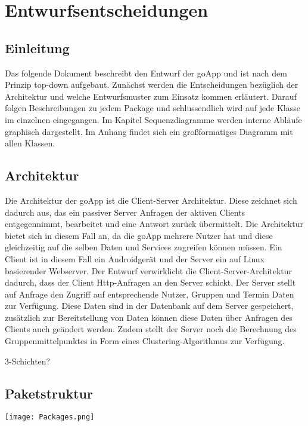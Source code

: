 

\section{Entwurfsentscheidungen}
	\subsection{Einleitung}
	Das folgende Dokument beschreibt den Entwurf der goApp und ist nach dem Prinzip top-down aufgebaut.
	Zunächst werden die Entscheidungen bezüglich der Architektur und welche Entwurfsmuster zum Einsatz kommen erläutert.
	Darauf folgen Beschreibungen zu jedem Package und schlussendlich wird auf jede Klasse im einzelnen eingegangen.
	Im Kapitel Sequenzdiagramme werden interne Abläufe graphisch dargestellt.
	Im Anhang findet sich ein großformatiges Diagramm mit allen Klassen.
	\subsection{Architektur}
	Die Architektur der goApp ist die Client-Server Architektur. Diese zeichnet sich dadurch aus, das ein passiver Server Anfragen der aktiven Clients entgegennimmt, bearbeitet und eine Antwort zurück übermittelt. Die Architektur bietet sich in diesem Fall an, da die goApp mehrere Nutzer hat und diese gleichzeitig auf die selben Daten und Services zugreifen können müssen. 
	Ein Client ist in diesem Fall ein Androidgerät und der Server ein auf Linux basierender Webserver.
	Der Entwurf verwirklicht die Client-Server-Architektur dadurch, dass der Client Http-Anfragen an den Server schickt. Der Server stellt auf Anfrage den Zugriff auf entsprechende Nutzer, Gruppen und Termin Daten zur Verfügung. Diese Daten sind in der Datenbank auf dem Server gespeichert, zusätzlich zur Bereitstellung von Daten können diese Daten über Anfragen des Clients auch geändert werden. Zudem stellt der Server noch die Berechnung des Gruppenmittelpunktes in Form eines Clustering-Algorithmus zur Verfügung. 
	 
	3-Schichten?
	
	
	\subsection{Paketstruktur}
	 \texttt{[image: Packages.png]}

